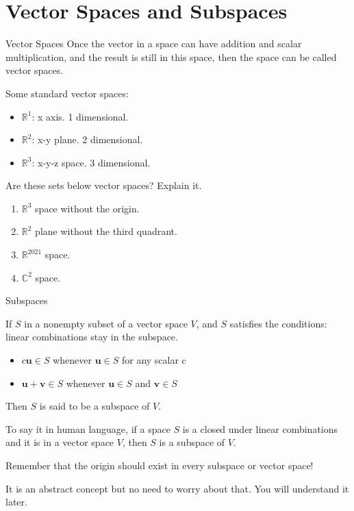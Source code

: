 \documentclass{beamer}
\begin{document}
\section{Vector Spaces and Subspaces}
\begin{frame}{Vector Spaces}
Once the vector in a space can have addition and scalar multiplication, and the result is still in this space, then the space can be called vector spaces.

Some standard vector spaces:
\begin{itemize}
    \item $\mathbb{R}^1$: x axis. 1 dimensional.
    \item $\mathbb{R}^2$: x-y plane. 2 dimensional.
    \item $\mathbb{R}^3$: x-y-z space. 3 dimensional.
\end{itemize}

\begin{example}
    Are these sets below vector spaces? Explain it.
    \begin{enumerate}
        \item $\mathbb{R}^3$ space without the origin.
        \item $\mathbb{R}^2$ plane without the third quadrant.
        \item $\mathbb{R}^{2021}$ space.
        \item $\mathbb{C}^2$ space.
    \end{enumerate}
\end{example}
\end{frame}

\begin{frame}{Subspaces}
\begin{definition}
    If $S$ in a nonempty subset of a vector space $V$, and $S$ satisfies the conditions: linear combinations stay in the subspace.
    \begin{itemize}
        \item $c\mathbf{u}\in S$ whenever $\mathbf{u}\in S$ for any scalar c
        \item $\mathbf{u} + \mathbf{v}\in S$ whenever $\mathbf{u}\in S$ and $\mathbf{v}\in S$
    \end{itemize}
    Then $S$ is said to be a subspace of $V$.
\end{definition}

To say it in human language, if a space $S$ is a closed under linear combinations and it is in a vector space $V$, then $S$ is a subspace of $V$.

\vspace{3pt}
Remember that the origin should exist in every subspace or vector space!

\vspace{3pt}
It is an abstract concept but no need to worry about that. You will understand it later.
\end{frame}
\end{document}
